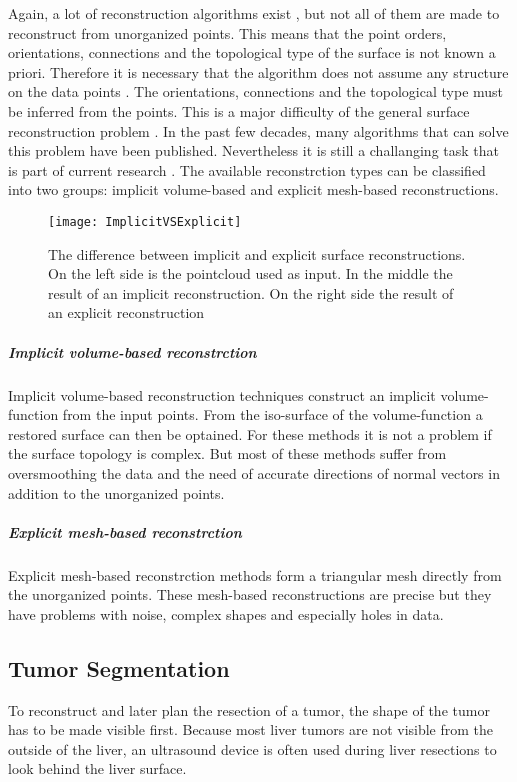 Again, a lot of reconstruction algorithms exist \cite{lim2014surface}, but not
all of them are made to reconstruct from unorganized points. This means
that the point orders, orientations, connections and the topological type of the
surface is not known a priori. Therefore it is necessary that the algorithm does not assume any structure
on the data points \cite{hornung2006robust} \cite{yu1999surface}. The orientations, connections and the topological
type must be inferred from the points. This is a major difficulty of the general surface
reconstruction problem \cite{hoppe1992surface}. In the past few decades, many
algorithms that can solve this problem have been published. Nevertheless it is
still a challanging task that is part of current research \cite{li2018surface}.
The available reconstrction types can be classified into two groups: implicit
volume-based and explicit mesh-based reconstructions.
\begin{figure}[H]
  \centering
 \texttt{[image: ImplicitVSExplicit]}
 \caption{The difference between implicit and explicit surface reconstructions.
   On the left side is the pointcloud used as input. In the middle the result of an
   implicit reconstruction. On the right side the result of an explicit
   reconstruction \cite{stanfordPP}}
  \label{fig:ImplicitVSExplicit}
\end{figure}
\subparagraph{Implicit volume-based reconstrction}
Implicit volume-based reconstruction techniques construct an implicit
volume-function from the input points. From the iso-surface of the
volume-function a restored surface can then be optained. For these methods it is
not a problem if the surface topology is complex. But most of these methods
suffer from oversmoothing the data and the need of accurate directions of normal
vectors in addition to the unorganized points. 
\subparagraph{Explicit mesh-based reconstrction}
Explicit mesh-based reconstrction methods form a triangular mesh directly from
the unorganized points. These mesh-based reconstructions are precise but they
have problems with noise, complex shapes and especially holes in data.
\subsection{Tumor Segmentation}
To reconstruct and later plan the resection of a tumor, the shape
of the tumor has to be made visible first. Because most liver tumors are not visible from the outside of the liver, an
ultrasound device is often used during liver resections to look behind the
liver surface.

